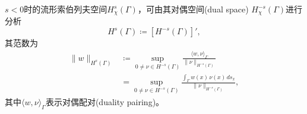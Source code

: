 \begin{lemma}[流形索伯列夫空间的等价范($s < 0$)]
$s<0$时的流形索伯列夫空间$H_{\chi}^{s}(\Gamma)$，可由其对偶空间(dual space) $H^{-s}_{\chi}(\Gamma)$进行分析
\begin{equation*}
  H^s(\Gamma) \coloneqq \left[ H^{-s}(\Gamma) \right]',
\end{equation*}
其范数为
\begin{equation}
  \label{eq:sobolev-manifold-dual-space-norm}
\begin{split}
  \big\| w \big\|_{H^{s}(\Gamma)} &\coloneqq \sup_{0 \neq \nu \in H^{-s} (\Gamma)}
  \frac{
  \langle w,\nu \rangle_{\Gamma}
  }{
  \big\| \nu \big\|_{H^{-s}(\Gamma)}
  }\\
  &= \sup_{0 \neq \nu \in H^{-s} (\Gamma)}
  \frac{
  \int_{\Gamma} w(x) \, \nu(x) \, d s_x
  }{
  \big\| \nu \big\|_{H^{-s}(\Gamma)}
  },
\end{split}
\end{equation}
其中$\langle w,\nu \rangle_{\Gamma}$表示对偶配对(duality pairing)。
\end{lemma}

